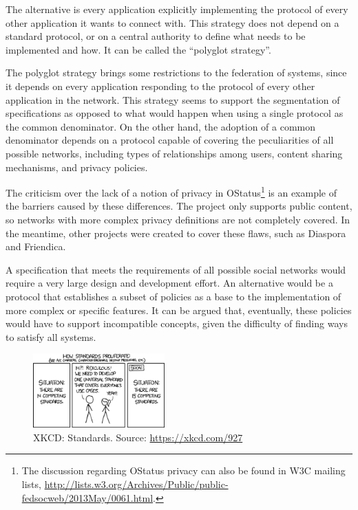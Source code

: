The alternative is every application explicitly implementing the
protocol of every other application it wants to connect with. This
strategy does not depend on a standard protocol, or on a central
authority to define what needs to be implemented and how. It can be
called the ``polyglot strategy''.

The polyglot strategy brings some restrictions to the federation of
systems, since it depends on every application responding to the
protocol of every other application in the network. This strategy seems
to support the segmentation of specifications as opposed to what would
happen when using a single protocol as the common denominator.  On the
other hand, the adoption of a common denominator depends on a protocol
capable of covering the peculiarities of all possible networks, including
types of relationships among users, content sharing mechanisms, and
privacy policies.

The criticism over the lack of a notion of privacy in
OStatus\footnote{The discussion regarding OStatus privacy can also be
found in W3C mailing lists,
\url{http://lists.w3.org/Archives/Public/public-fedsocweb/2013May/0061.html}.}
is an example of the barriers caused by these differences. The project
only supports public content, so networks with more complex privacy
definitions are not completely covered. In the meantime, other projects were
created to cover these flaws, such as Diaspora and Friendica.

A specification that meets the requirements of all possible social
networks would require a very large design and development effort. An
alternative would be a protocol that establishes a subset of policies as
a base to the implementation of more complex or specific features. It
can be argued that, eventually, these policies would have to support
incompatible concepts, given the difficulty of finding ways to satisfy
all systems.

\begin{figure}[!hbt]
  \centering
  \includegraphics[width=0.45\textwidth]{figures/xkcd-standards.eps}
  \caption{XKCD: Standards. Source: \url{https://xkcd.com/927}}
  \label{fig:xkcd_standards}
\end{figure}

